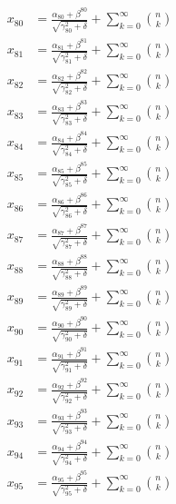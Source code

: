 \documentclass{article}
\begin{document}
\begin{align}
  x_{80} &= \frac{\alpha_{80} + \beta^{80}}{\sqrt{\gamma_{80}^2 + \delta}} + \sum_{k=0}^{\infty} \binom{n}{k} \label{eq:80} \\
  x_{81} &= \frac{\alpha_{81} + \beta^{81}}{\sqrt{\gamma_{81}^2 + \delta}} + \sum_{k=0}^{\infty} \binom{n}{k} \label{eq:81} \\
  x_{82} &= \frac{\alpha_{82} + \beta^{82}}{\sqrt{\gamma_{82}^2 + \delta}} + \sum_{k=0}^{\infty} \binom{n}{k} \label{eq:82} \\
  x_{83} &= \frac{\alpha_{83} + \beta^{83}}{\sqrt{\gamma_{83}^2 + \delta}} + \sum_{k=0}^{\infty} \binom{n}{k} \label{eq:83} \\
  x_{84} &= \frac{\alpha_{84} + \beta^{84}}{\sqrt{\gamma_{84}^2 + \delta}} + \sum_{k=0}^{\infty} \binom{n}{k} \label{eq:84} \\
  x_{85} &= \frac{\alpha_{85} + \beta^{85}}{\sqrt{\gamma_{85}^2 + \delta}} + \sum_{k=0}^{\infty} \binom{n}{k} \label{eq:85} \\
  x_{86} &= \frac{\alpha_{86} + \beta^{86}}{\sqrt{\gamma_{86}^2 + \delta}} + \sum_{k=0}^{\infty} \binom{n}{k} \label{eq:86} \\
  x_{87} &= \frac{\alpha_{87} + \beta^{87}}{\sqrt{\gamma_{87}^2 + \delta}} + \sum_{k=0}^{\infty} \binom{n}{k} \label{eq:87} \\
  x_{88} &= \frac{\alpha_{88} + \beta^{88}}{\sqrt{\gamma_{88}^2 + \delta}} + \sum_{k=0}^{\infty} \binom{n}{k} \label{eq:88} \\
  x_{89} &= \frac{\alpha_{89} + \beta^{89}}{\sqrt{\gamma_{89}^2 + \delta}} + \sum_{k=0}^{\infty} \binom{n}{k} \label{eq:89} \\
  x_{90} &= \frac{\alpha_{90} + \beta^{90}}{\sqrt{\gamma_{90}^2 + \delta}} + \sum_{k=0}^{\infty} \binom{n}{k} \label{eq:90} \\
  x_{91} &= \frac{\alpha_{91} + \beta^{91}}{\sqrt{\gamma_{91}^2 + \delta}} + \sum_{k=0}^{\infty} \binom{n}{k} \label{eq:91} \\
  x_{92} &= \frac{\alpha_{92} + \beta^{92}}{\sqrt{\gamma_{92}^2 + \delta}} + \sum_{k=0}^{\infty} \binom{n}{k} \label{eq:92} \\
  x_{93} &= \frac{\alpha_{93} + \beta^{93}}{\sqrt{\gamma_{93}^2 + \delta}} + \sum_{k=0}^{\infty} \binom{n}{k} \label{eq:93} \\
  x_{94} &= \frac{\alpha_{94} + \beta^{94}}{\sqrt{\gamma_{94}^2 + \delta}} + \sum_{k=0}^{\infty} \binom{n}{k} \label{eq:94} \\
  x_{95} &= \frac{\alpha_{95} + \beta^{95}}{\sqrt{\gamma_{95}^2 + \delta}} + \sum_{k=0}^{\infty} \binom{n}{k} \label{eq:95} \\

\end{align}
\end{document}
